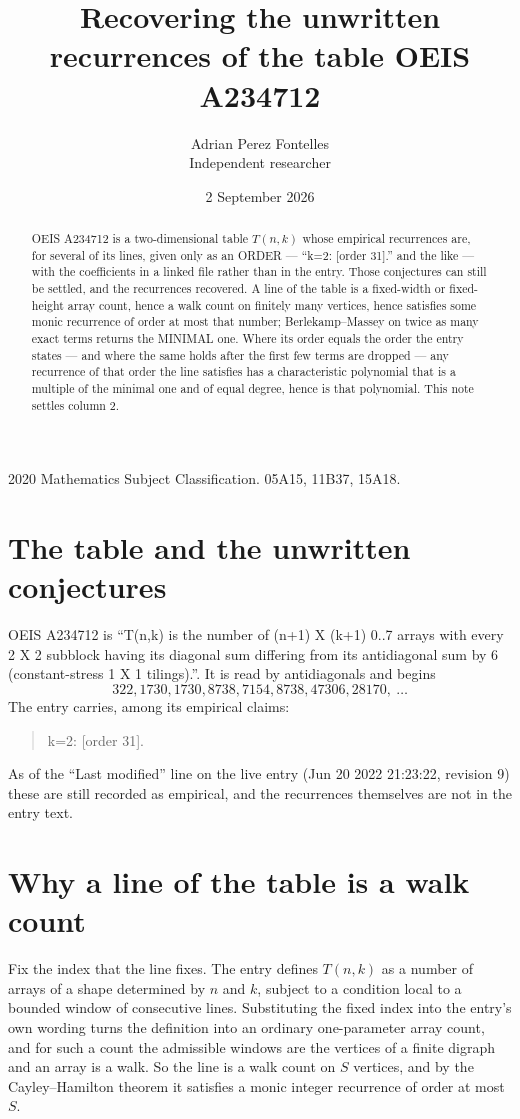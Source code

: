 \documentclass[11pt,a4paper]{article}
\title{Recovering the unwritten recurrences of the table OEIS A234712}
\author{Adrian Perez Fontelles\\ \small Independent researcher}
\date{2 September 2026}
\theoremstyle{plain}
\theoremstyle{definition}
\begin{document}
\maketitle

\begin{abstract}
OEIS A234712 is a two-dimensional table $T(n,k)$ whose empirical recurrences are, for several of
its lines, given only as an ORDER --- ``k=2: [order 31].'' and the like --- with the
coefficients in a linked file rather than in the entry. Those conjectures can still be settled,
and the recurrences recovered. A line of the table is a fixed-width or fixed-height array
count, hence a walk count on finitely many vertices, hence satisfies some monic recurrence of
order at most that number; Berlekamp--Massey on twice as many exact terms returns the MINIMAL
one. Where its order equals the order the entry states --- and where the same holds after the
first few terms are dropped --- any recurrence of that order the line satisfies has a
characteristic polynomial that is a multiple of the minimal one and of equal degree, hence is
that polynomial. This note settles column 2.
\end{abstract}

\noindent\small 2020 Mathematics Subject Classification. 05A15, 11B37, 15A18.\normalsize

\section{The table and the unwritten conjectures}

OEIS A234712 is ``T(n,k) is the number of (n+1) X (k+1) 0..7 arrays with every 2 X 2 subblock having its diagonal sum differing from its antidiagonal sum by 6 (constant-stress 1 X 1 tilings).''. It is read by antidiagonals and begins
\[
322, 1730, 1730, 8738, 7154, 8738, 47306, 28170,\ \dots
\]
The entry carries, among its empirical claims:
\begin{quote}\small
k=2: [order 31].
\end{quote}
As of the ``Last modified'' line on the live entry (Jun 20 2022 21:23:22, revision 9) these are still
recorded as empirical, and the recurrences themselves are not in the entry text.

\section{Why a line of the table is a walk count}

Fix the index that the line fixes. The entry defines $T(n,k)$ as a number of arrays of a shape
determined by $n$ and $k$, subject to a condition local to a bounded window of consecutive
lines. Substituting the fixed index into the entry's own wording turns the definition into an
ordinary one-parameter array count, and for such a count the admissible windows are the
vertices of a finite digraph and an array is a walk. So the line is a walk count on $S$
vertices, and by the Cayley--Hamilton theorem it satisfies a monic integer recurrence of order
at most $S$.
\end{document}

